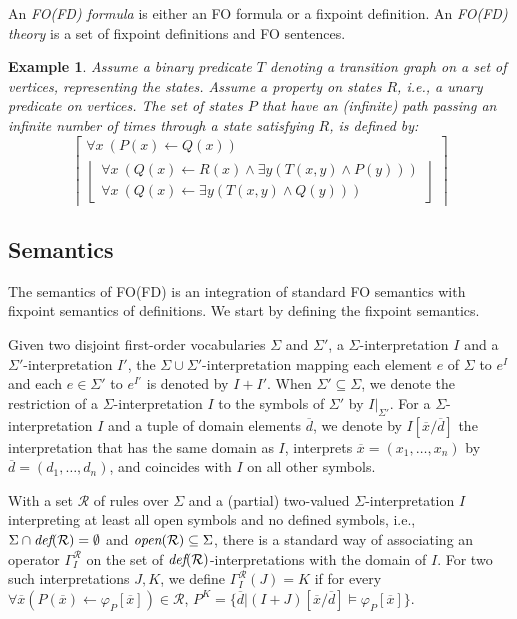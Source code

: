 \documentclass{tlp}
\newcommand{\rul}{\leftarrow}
\newcommand{\xxx}{\overline{x}}
\newcommand{\ddd}{\overline{d}}
\newcommand{\lfd}[1]{\ensuremath{\left \lfloor \begin{array}{l}#1\end{array} \right \rfloor }}
\newcommand{\gfd}[1]{\ensuremath{\left \lceil \begin{array}{l}#1\end{array} \right \rceil}}
\newcommand{\defp}[1]{\ensuremath{\mbox{\it def}(#1)}\xspace}
\newcommand{\openp}[1]{\ensuremath{\mbox{\it open}(#1)}\xspace}
\newcommand{\Op}[2]{\ensuremath{\Gamma_{#1}^{#2}}}
\newcommand{\Voc}{\ensuremath{\Sigma}\xspace}
\newcommand{\Rules}{\ensuremath{\mathcal{R}}\xspace}
\newcommand{\res}[2]{{{#1}\rvert_{#2}}}
\newtheorem{example}[lemma]{Example}
\begin{document}
An {\em FO(FD) formula} is either an FO formula or a fixpoint definition. An {\em FO(FD) theory} is a set of fixpoint definitions and FO sentences.

\begin{example}\label{ex:infinitetr}
Assume a binary predicate $T$ denoting a transition graph on a set of vertices, representing the states. Assume a property on states $R$, i.e., a unary predicate on vertices. The set of states $P$ that have an (infinite) path passing an infinite number of times through a state satisfying $R$, is defined by:
\[\gfd{ \forall x\ (P(x) \rul Q(x))\\
			\lfd{ \forall x\ (Q(x) \rul R(x) \land \exists y (T(x,y) \land P(y)))\\
					\forall x\ (Q(x) \rul \exists y (T(x,y) \land Q(y)))}}\]
\end{example}

\subsection{Semantics}


The semantics of FO(FD) is an integration of standard FO semantics with fixpoint semantics of definitions. We start by defining the fixpoint semantics.

Given two disjoint first-order vocabularies $\Sigma$ and $\Sigma'$, a $\Sigma$-interpretation $I$ and a $\Sigma'$-interpretation $I'$, the $\Sigma \cup \Sigma'$-interpretation mapping each element $e$ of $\Sigma$ to $e^{I}$ and each $e \in \Sigma'$ to $e^{I'}$ is denoted by $I+I'$. When $\Sigma' \subseteq \Sigma$, we denote the restriction of a $\Sigma$-interpretation $I$ to the symbols of $\Sigma'$ by $\res{I}{\Sigma'}$. For a $\Sigma$-interpretation $I$ and a tuple of domain elements $\ddd$, we denote by $I[\xxx/\ddd]$ the interpretation that has the same domain as $I$, interprets $\xxx = (x_1, \ldots, x_n)$ by $\ddd = (d_1, \ldots, d_n)$, and coincides with $I$ on all other symbols.

With a set $\Rules$ of rules over $\Sigma$ and a (partial) two-valued $\Voc$-interpretation $I$ interpreting at least all open symbols and no defined symbols, i.e., $\Voc\cap\defp{\Rules}=\emptyset$ and $\openp{\Rules}\subseteq\Voc$, there is a standard way of associating an operator $\Op{I}{\Rules}$ on the set of $\defp{\Rules}$-interpretations with the domain of $I$. For two such interpretations $J, K$, we define $\Op{I}{\Rules}(J)=K$ if for every $\forall \xxx (P(\xxx) \rul \varphi_P[\xxx]) \in \Rules$, $P^K =\{ \ddd | (I+J)[\xxx/\ddd] \models \varphi_P[\xxx]\}$.
\end{document}
